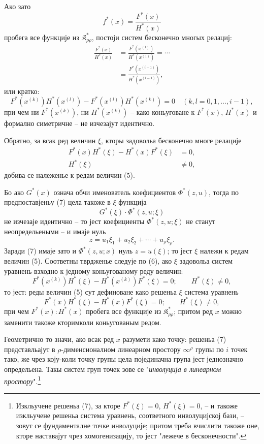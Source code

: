 ﻿\documentclass[11pt]{article}
\providecommand{\Kfield}{\mathfrak{K}}
\begin{document}
Ако зато
\[
  f^*(x)=\frac{F^*(x)}{H^*(x)}
\]
пробега все функције из $\Kfield^*_{\rho\rho}$, постоји систем бесконечно многых релациј:
\begin{equation}
\begin{aligned}
  \frac{F^*(x)}{H^*(x)}
  &=\frac{F^*(x^{(1)})}{H^*(x^{(1)})}=\cdots\\
  &=\frac{F^*(x^{(i-1)})}{H^*(x^{(i-1)})},
\end{aligned}
\tag{6}
\end{equation}
или кратко:
\[
  F^*(x^{(k)})H^*(x^{(l)})-
  F^*(x^{(l)})H^*(x^{(k)})=0
  \quad(k,l=0,1,\ldots,i-1),
\]
при чем ни $F^*(x^{(k)})$, ни $H^*(x^{(k)})$ -- како коньуговане к $F^*(x)$, $H^*(x)$ и формално симетричне -- не изчезајут идентично.

Обратно, за всак ред величин $\xi$, кторы задовольа бесконечно многе релације
\begin{equation}
\begin{aligned}
  F^*(x)H^*(\xi)-H^*(x)F^*(\xi)&=0,\\
  H^*(\xi)&\ne0,
\end{aligned}
\tag{7}
\end{equation}
добива се належенье к редам величин (5).

Бо ако $G^*(x)$ означа обчи именователь коефициентов $\Phi^*(z,u)$, тогда по предпоставјеньу (7) цела такоже в $\xi$ функција
\[
  G^*(\xi)\cdot\Phi^*(z,u;\xi)
\]
не изчезаје идентично -- то јест коефициенты $\Phi^*(z,u;\xi)$ не станут неопредельеными -- и имаје нуль
\[
  z=u_1\xi_1+u_2\xi_2+\cdots+u_\rho\xi_\rho.
\]
Заради (7) имаје зато и $\Phi^*(z,u;x)$ нуль $z=u(\xi)$; то јест $\xi$ належи к редам величин (5). Соответны тврдженье следује по (6), ако $\xi$ задовольа систем уравнень взходно к једному коньугованому реду величин:
\[
  F^*(x^{(k)})H^*(\xi)-H^*(x^{(k)})F^*(\xi)=0;
  \qquad H^*(\xi)\ne0,
\]
то јест: реды величин (5) сут дефиноване како решеньа $\xi$ система уравнень
\[
  F^*(x)H^*(\xi)-H^*(x)F^*(\xi)=0;
  \qquad H^*(\xi)\ne0,
\]
при чем $F^*(x):H^*(x)$ пробега все функције из $\Kfield^*_{\rho\rho}$; притом ред $x$ можно заменити такоже кторимколи коньугованым редом.

Геометрично то значи, ако всак ред $x$ разумети како точку: решеньа (7) представльајут в $\rho$-дименсионалном линеарном простору $\infty^\rho$ групы по $i$ точек тако, же чрез коју-коли точку групы цела појединачна група јест једнозначно определьена. Такы систем груп точек зове се "{\itshape инволуција в линеарном простору}".\footnote{Изкльучене решеньа (7), за кторе $F^*(\xi)=0$, $H^*(\xi)=0$, -- и такоже изкльучене решеньа система уравнень, соответного инволуцијској бази, -- зовут се фундаменталне точке инволуције; притом треба вчислити такоже оне, кторе наставајут чрез хомогенизацију, то јест "лежече в бесконечности".}
\end{document}
